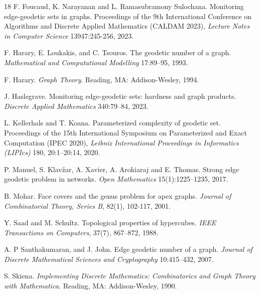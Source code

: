 \documentclass[10pt,a4paper]{article}
\begin{document}
\begin{thebibliography}{18}
 F. Foucaud, K. Narayanan and L. Ramasubramony Sulochana. Monitoring edge-geodetic sets in graphs. Proceedings of the 9th International Conference on Algorithms and Discrete Applied Mathematics (CALDAM 2023), \emph{Lecture Notes in Computer Science} 13947:245-256, 2023.


 F. Harary, E. Loukakis, and C. Tsouros. The geodetic number of a graph. \emph{Mathematical and Computational Modelling} 17:89–95, 1993.

 F. Harary. \emph{Graph Theory}. Reading, MA: Addison-Wesley, 1994.

 J. Haslegrave. Monitoring edge-geodetic sets: hardness and graph products. \emph{Discrete Applied Mathematics} 340:79--84, 2023.

 L. Kellerhals and T. Koana. Parameterized complexity of geodetic set. Proceedings of the 15th International Symposium on Parameterized and Exact Computation (IPEC 2020), \emph{Leibniz International Proceedings in Informatics (LIPIcs)} 180, 20:1--20:14, 2020.

 P. Manuel, S. Klav\v{z}ar, A. Xavier, A. Arokiaraj and E. Thomas. Strong edge geodetic problem in networks. \emph{Open Mathematics} 15(1):1225--1235, 2017.


B. Mohar. Face covers and the genus problem for apex graphs. \emph{Journal of Combinatorial Theory, Series B}, 82(1), 102-117, 2001.

Y. Saad and M. Schultz. Topological properties of hypercubes. \emph{IEEE Transactions on Computers}, 37(7), 867–872, 1988.

A. P Santhakumaran, and J. John. Edge geodetic number of a graph. \emph{Journal of Discrete Mathematical Sciences and Cryptography} 10:415–432, 2007.



S. Skiena. \emph{Implementing Discrete Mathematics: Combinatorics and Graph Theory with Mathematica.} Reading, MA: Addison-Wesley, 1990.


\end{thebibliography}
\end{document}
